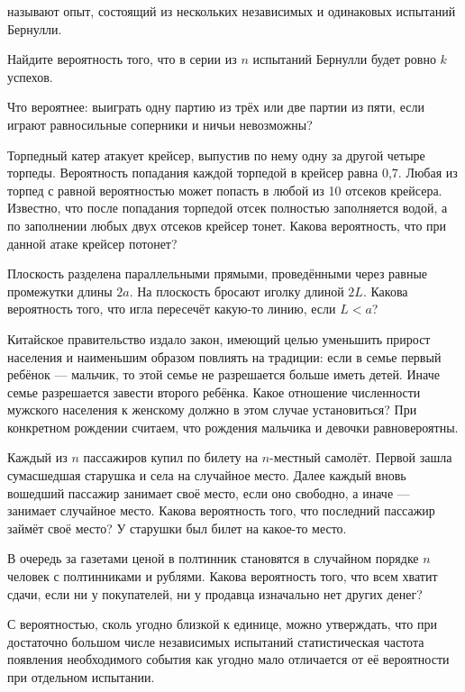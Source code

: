 \documentclass[a4paper,12pt]{article}
\begin{document}
   называют опыт, состоящий из нескольких независимых и одинаковых испытаний Бернулли.

  Найдите вероятность того, что в серии из $n$ испытаний Бернулли будет ровно $k$ успехов.

  Что вероятнее: выиграть одну партию из трёх или две партии из пяти, если играют равносильные соперники и ничьи невозможны?

  Торпедный катер атакует крейсер, выпустив по нему одну за другой четыре торпеды. Вероятность попадания каждой торпедой в крейсер равна 0,7. Любая из торпед с равной вероятностью может попасть в любой из 10 отсеков крейсера. Известно, что после попадания торпедой отсек полностью заполняется водой, а по заполнении любых двух отсеков крейсер тонет. Какова вероятность, что при данной атаке крейсер потонет?

  Плоскость разделена параллельными прямыми, проведёнными через равные промежутки длины $2a$. На плоскость бросают иголку длиной $2L$. Какова вероятность того, что игла пересечёт какую-то линию, если $L<a$?

  Китайское правительство издало закон, имеющий целью уменьшить прирост населения и наименьшим образом повлиять на традиции: если в семье первый ребёнок --- мальчик, то этой семье не разрешается больше иметь детей. Иначе семье разрешается завести второго ребёнка. Какое отношение численности мужского населения к женскому должно в этом случае установиться? При конкретном рождении считаем, что рождения мальчика и девочки равновероятны.

  Каждый из $n$ пассажиров купил по билету на $n$-местный самолёт. Первой зашла сумасшедшая старушка и села на случайное место. Далее каждый вновь вошедший пассажир занимает своё место, если оно свободно, а иначе --- занимает случайное место. Какова вероятность того, что последний пассажир займёт своё место? У старушки был билет на какое-то место.

  В очередь за газетами ценой в полтинник становятся в случайном порядке $n$ человек с полтинниками и рублями. Какова вероятность того, что всем хватит сдачи, если ни у покупателей, ни у продавца изначально нет других денег?

  С вероятностью, сколь угодно близкой к единице, можно утверждать, что при достаточно большом числе независимых испытаний статистическая частота появления необходимого события как угодно мало отличается от её вероятности при отдельном испытании.
\end{document}
